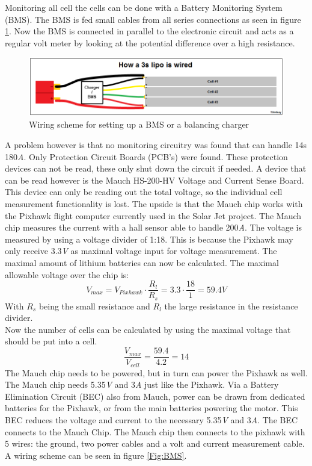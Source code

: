 Monitoring all cell the cells can be done with a Battery Monitoring System (BMS). The BMS is fed small cables from all series connections as seen in figure \ref{Fig:Wiring_Scheme}. Now the BMS is connected in parallel to the electronic circuit and acts as a regular volt meter by looking at the potential difference over a high resistance. 
\begin{figure} [H]
	\centering
	\includegraphics[width=0.8\linewidth]{Figures/balancing.png}
	\caption{Wiring scheme for setting up a BMS or a balancing charger}
   \label{Fig:Wiring_Scheme}
\end{figure}
A problem however is that no monitoring circuitry was found that can handle 14s 180\textit{A}. Only Protection Circuit Boards (PCB's) were found. These protection devices can not be read, these only shut down the circuit if needed. A device that can be read however is the Mauch HS-200-HV Voltage and Current Sense Board\cite{Mauch}. This device can only be reading out the total voltage, so the individual cell measurement functionality is lost. The upside is that the Mauch chip works with the Pixhawk flight computer currently used in the Solar Jet project. The Mauch chip measures the current with a hall sensor able to handle 200\textit{A}. The voltage is measured by using a voltage divider of 1:18. This is because the Pixhawk may only receive 3.3\textit{V} as maximal voltage input for voltage measurement. The maximal amount of lithium batteries can now be calculated. The maximal allowable voltage over the chip is:
\begin{equation}
V_{max} = V_{Pixhawk} \cdot \frac{R_l}{R_s} = 3.3 \cdot \frac{18}{1} = 59.4\textit{V} 
\end{equation}
With $R_s$ being the small resistance and $R_l$ the large resistance in the resistance divider.\\
Now the number of cells can be calculated by using the maximal voltage that should be put into a cell.
\begin{equation}
\frac{V_{max}}{V_{cell}} = \frac{59.4}{4.2} = 14
\end{equation}
The Mauch chip needs to be powered, but in turn can power the Pixhawk as well. The Mauch chip needs 5.35\textit{V} and 3\textit{A} just like the Pixhawk. Via a Battery Elimination Circuit (BEC) also from Mauch, power can be drawn from dedicated batteries for the Pixhawk, or from the main batteries powering the motor. This BEC reduces the voltage and current to the necessary 5.35\textit{V} and 3\textit{A}. The BEC connects to the Mauch Chip. The Mauch chip then connects to the pixhawk with 5 wires: the ground, two power cables and a volt and current measurement cable. A wiring scheme can be seen in figure \ref{Fig:BMS}.

